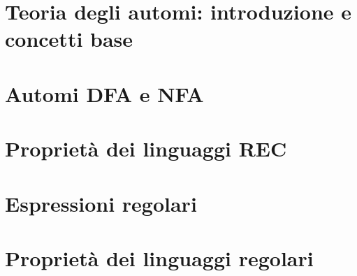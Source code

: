 \documentclass[12pt]{article}
\begin{document}


\tableofcontents
\restoregeometry

\section{Teoria degli automi: introduzione e concetti base}


\section{Automi DFA e NFA}


\section{Proprietà dei linguaggi REC}


\section{Espressioni regolari}


\section{Proprietà dei linguaggi regolari}

\end{document}

